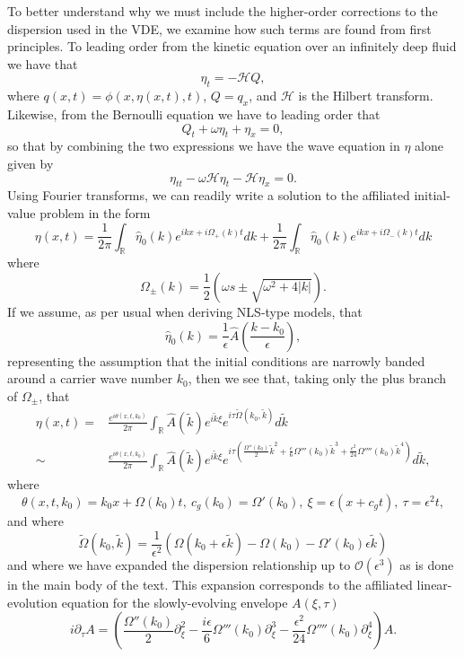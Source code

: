\documentclass[a4paper,11pt]{article}
\newcommand{\pd}{\partial}
\begin{document}
To better understand why we must include the higher-order corrections to the dispersion used in the VDE, we examine how such terms are found from first principles.  To leading order from the kinetic equation over an infinitely deep fluid we have that 
\[
\eta_{t} = -\mathcal{H}Q,
\]
where $q(x,t) = \phi(x,\eta(x,t),t)$, $Q = q_{x}$, and $\mathcal{H}$ is the Hilbert transform.  Likewise, from the Bernoulli equation we have to leading order that
\[
Q _{t}+ \omega\eta_{t} + \eta_{x}= 0, 
\]
so that by combining the two expressions we have the wave equation in $\eta$ alone given by 
\begin{equation}
\eta_{tt}- \omega\mathcal{H}\eta_{t} - \mathcal{H}\eta_{x}= 0.
\label{linearwaveeq}
\end{equation}
Using Fourier transforms, we can readily write a solution to the affiliated initial-value problem in the form
\[
\eta(x,t) = \frac{1}{2\pi}\int_{\mathbb{R}}\hat{\eta}_{0}(k) e^{ikx+i\Omega_{+}(k)t} dk + \frac{1}{2\pi}\int_{\mathbb{R}}\hat{\eta}_{0}(k) e^{ikx+i\Omega_{-}(k)t} dk
\]
where
\[
\Omega_{\pm}(k) = \frac{1}{2}\left(\omega s \pm \sqrt{\omega^{2}+4|k|} \right).
\]
If we assume, as per usual when deriving NLS-type models, that 
\[
\hat{\eta}_{0}(k) = \frac{1}{\epsilon}\hat{A}\left(\frac{k-k_{0}}{\epsilon} \right), 
\]
representing the assumption that the initial conditions are narrowly banded around a carrier wave number $k_{0}$, then we see that, taking only the plus branch of $\Omega_{\pm}$, that  
\begin{align*}
\eta(x,t) = & \frac{e^{i\theta(x,t,k_{0})}}{2\pi}\int_{\mathbb{R}}\hat{A}(\tilde{k})e^{i\tilde{k}\xi} e^{i\tau \tilde{\Omega}(k_{0},\tilde{k})}d\tilde{k}\\
\sim & \frac{e^{i\theta(x,t,k_{0})}}{2\pi}\int_{\mathbb{R}}\hat{A}(\tilde{k})e^{i\tilde{k}\xi}e^{i\tau\left(\frac{\Omega''(k_{0})}{2}\tilde{k}^{2} + \frac{\epsilon}{6}\Omega'''(k_{0})\tilde{k}^{3} + \frac{\epsilon^{2}}{24}\Omega''''(k_{0})\tilde{k}^{4}\right)}d\tilde{k},
\end{align*}
where
\[
\theta(x,t,k_{0}) = k_{0}x + \Omega(k_{0})t, ~c_{g}(k_{0}) = \Omega'(k_{0}), ~ \xi = \epsilon(x+c_{g}t), ~ \tau = \epsilon^{2}t, 
\]
and where
\[
\tilde{\Omega}(k_{0},\tilde{k}) = \frac{1}{\epsilon^{2}}\left(\Omega(k_{0}+\epsilon \tilde{k})-\Omega(k_{0})-\Omega'(k_{0})\epsilon\tilde{k}\right) 
\]
and where we have expanded the dispersion relationship up to $\mathcal{O}(\epsilon^{3})$ as is done in the main body of the text.  This expansion corresponds to the affiliated linear-evolution equation for the slowly-evolving envelope $A(\xi,\tau)$
\[
i\pd_{\tau}A = \left(\frac{\Omega''(k_{0})}{2}\pd_{\xi}^{2}-\frac{i\epsilon}{6}\Omega'''(k_{0})\pd_{\xi}^{3} - \frac{\epsilon^{2}}{24}\Omega''''(k_{0})\pd_{\xi}^{4}\right)A. 
\]
\end{document}
